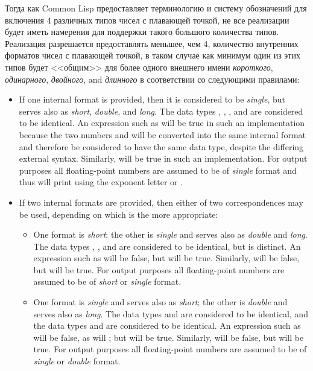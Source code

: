 Тогда как Common Lisp предоставляет терминологию и систему обозначений для
включения 4 различных типов чисел с плавающей точкой, не все реализации будет
иметь намерения для поддержки такого большого количества типов.
Реализация разрешается предоставлять меньшее, чем 4, количество внутренних
форматов чисел с плавающей точкой, в таком случае как минимум один из этих типов
будет <<общим>> для более одного внешнего имени {\it короткого}, {\it одинарного},
{\it двойного}, and {\it длинного} в соответствии со следующими правилами:
\begin{itemize}
\item
If one internal format is provided, then it is considered to be
{\it single}, but serves also as {\it short}, {\it double}, and {\it long}.
The data types ,
, , and  are
considered to be identical.  An expression such as 
will be true in such an implementation
because the two numbers  and  will
be converted into the same internal format and therefore be considered
to have the same data type, despite the differing external syntax.
Similarly,  will be true in such
an implementation.
For output purposes all floating-point numbers are assumed to be
of {\it single} format and thus will print using the
exponent letter  or .

\item
If two internal formats are provided, then either of two correspondences
may be used, depending on which is the more appropriate:
\begin{itemize}
\item
One format is {\it short}; the other is {\it single} and serves also
as {\it double} and {\it long}.
The data types
, , and  are
considered to be identical, but  is distinct.
An expression such as 
will be false, but  will be true.
Similarly,  will be false,
but  will be true.
For output purposes all floating-point numbers are assumed to be
of {\it short} or {\it single} format.

\item
One format is {\it single} and serves also as {\it short};
the other is {\it double} and serves also as {\it long}.
The data types  and  are considered to be
identical, and the data types  and  are
considered to be identical.
An expression such as 
will be false, as will ;
but  will be true.
Similarly,  will be false,
but  will be true.
For output purposes all floating-point numbers are assumed to be
of {\it single} or {\it double} format.
\end{itemize}


\end{itemize}
